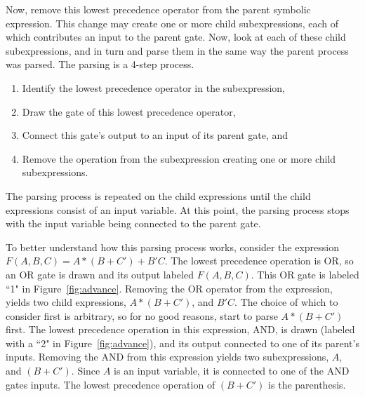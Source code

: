 Now, remove this lowest precedence operator from the parent symbolic 
expression.  This change may create one 
or more child subexpressions, each of which contributes an input to the 
parent gate.  Now, look at each of these child subexpressions, and in turn and 
parse them in the same way the parent process was parsed.  The parsing is a 
4-step process.

\begin{enumerate}
\item Identify the lowest precedence operator in the subexpression,
\item Draw the gate of this lowest precedence operator,
\item Connect this gate's output to an input of its parent gate, and
\item Remove the operation from the subexpression creating one or more 
child subexpressions.
\end {enumerate}

The parsing process is repeated on the child expressions until the child
expressions consist of an input variable.  At this point, the parsing process
stops with the input variable being connected to the parent gate.

To better understand how this parsing process works, consider the expression 
$F(A,B,C) = A*(B+C')+B'C$.  The lowest precedence operation is OR, so
an OR gate is drawn and its output labeled $F(A,B,C)$.  This OR gate
is labeled ``1" in Figure~\ref{fig:advance}.  Removing the OR operator
from the expression, yields two child expressions, $A*(B+C')$, and
$B'C$.  The choice of which to consider first is arbitrary, so for 
no good reasons, start to parse $A*(B+C')$ first.  The lowest precedence
operation in this expression, AND, is drawn (labeled with a ``2"
in Figure~\ref{fig:advance}), and its output connected to one of its 
parent's inputs.  Removing the AND from this expression yields two 
subexpressions, $A$, and $(B+C')$.  Since $A$ is an input variable,
it is connected to one of the AND gates inputs.  The lowest precedence
operation of $(B+C')$ is the parenthesis.  

